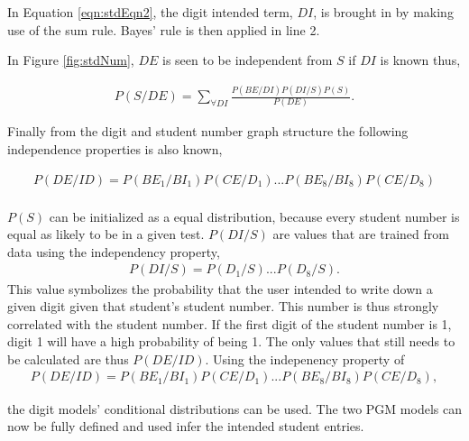 In Equation \ref{eqn:stdEqn2}, the digit intended term, $DI$, is brought in by making use of the sum rule. Bayes' rule is then applied in line 2.

In Figure \ref{fig:stdNum}, $DE$ is seen to be independent from $S$ if $DI$ is known thus,

\begin{align}
  P(S/DE)	=  \sum_{\forall DI}^{}  \frac{P(BE/DI)P(DI/S)P(S)}{P(DE)}.
\label{eqn:stdEqn3}
\end{align}

Finally from the digit and student number graph structure the following independence properties is also known,



\begin{align}
P(DE/ID) = P(BE_1/BI_1)P(CE/D_1)...P(BE_8/BI_8)P(CE/D_8)\\
\label{eqn:stdEqn4}
\end{align}


$P(S)$ can be initialized as a equal distribution, because every student number is equal as likely to be in a given test. $P(DI/S)$ are values that are trained from data using the independency property, 
\begin{align}
P(DI/S) = P(D_1/S)...P(D_8/S).
\label{eqn:stdEqn4}
\end{align}
This value symbolizes the probability that the user intended to write down a given digit given that student's student number. This number is thus strongly correlated with the student number. If the first digit of the student number is 1, digit 1 will have a high probability of being 1. The only values that still needs to be calculated are thus $P(DE/ID)$. Using the indepenency property of \begin{align}
P(DE/ID) = P(BE_1/BI_1)P(CE/D_1)...P(BE_8/BI_8)P(CE/D_8),
\label{eqn:stdEqn4}
\end{align}

the digit models' conditional distributions can be used. The two PGM models can now be fully defined and used infer the intended student entries.